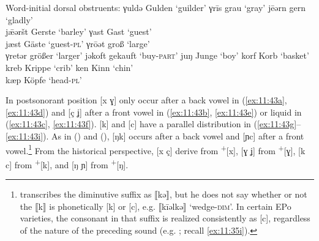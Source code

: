 \ea%
\label{ex:11:42}Word-initial dorsal obstruents:
\ea\label{ex:11:42a}  γuldə      \tab [ɣʊldə]    \tab Gulden  \tab ‘guilder’ 
\ex\label{ex:11:42b}  γrīs       \tab [ɣriːs]    \tab grau    \tab ‘gray’    
\ex\label{ex:11:42c}  jēərn      \tab [ʝeːərn]   \tab gern    \tab ‘gladly’  \\
     j\={æ}əršt \tab [ʝæːərʃt]  \tab Gerste  \tab ‘barley’  
\ex\label{ex:11:42d}  γast   \tab [ɣɑst]         \tab Gast    \tab ‘guest’   \\
     jæst   \tab [ʝæst]         \tab Gäste   \tab ‘guest-\textsc{pl}’  
\ex\label{ex:11:42e}  γrōət  \tab [ɣroːət]       \tab groß    \tab ‘large’   \\
     γretər \tab [ɣrɛtər]       \tab größer  \tab ‘larger’  
\ex\label{ex:11:42f}  jəkoft \tab [jəkɔft]       \tab gekauft \tab ‘buy-\textsc{part}’ 
\ex\label{ex:11:42g}  juŋ    \tab [ʝʊŋ]          \tab Junge   \tab ‘boy’    
\ex\label{ex:11:42h}  korf   \tab [kɔrf]         \tab Korb    \tab ‘basket’ 
\ex\label{ex:11:42i}  kreb   \tab [krɛb]         \tab Krippe  \tab ‘crib’   
\ex\label{ex:11:42j}  ken    \tab [cɛn]          \tab Kinn    \tab ‘chin’   \\
     kæp    \tab [cæp]          \tab Köpfe   \tab ‘head-\textsc{pl}’  
\z 
\z 

In postsonorant position [x ɣ] only occur after a back vowel in (\ref{ex:11:43a}, \ref{ex:11:43d}) and [ç ʝ] after a front vowel in (\ref{ex:11:43b}, \ref{ex:11:43e}) or liquid in (\ref{ex:11:43c}, \ref{ex:11:43f}). [k] and [c] have a parallel distribution in (\ref{ex:11:43g}--\ref{ex:11:43i}). As in  () and  (), [ŋk] occurs after a back vowel and [ɲc] after a front vowel.\footnote{{\citet[26]{Natau1937} transcribes the diminutive suffix as ⟦kə⟧, but he does not say whether or not the ⟦k⟧ is phonetically [k] or [c], e.g. ⟦kīəlkə⟧ ‘wedge-}\textrm{\textsc{dim}}\textrm{’. In certain EPo varieties, the consonant in that suffix is realized consistently as [c], regardless of the nature of the preceding sound (e.g. ; recall \ref{ex:11:35i}).} } From the historical perspective, [x ç] derive from  \textsuperscript{+}[x], [ɣ ʝ] from  \textsuperscript{+}[ɣ], [k c] from  \textsuperscript{+}[k], and [ŋ ɲ] from  \textsuperscript{+}[ŋ].

